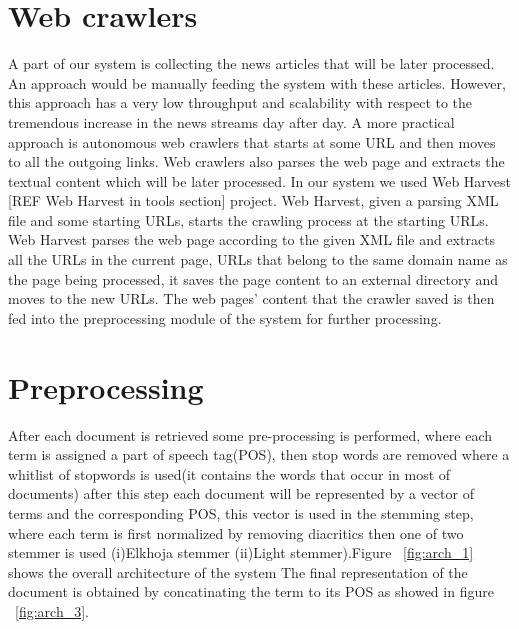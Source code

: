 \section{Web crawlers}\label{sec:crowlers}
A part of our system is collecting the news articles that will be later processed. An approach would be manually feeding the system with these articles. However, this approach has a very low throughput and scalability with respect to the tremendous increase in the news streams day after day. A more practical approach is autonomous web crawlers that starts at some URL and then moves to all the outgoing links. Web crawlers also parses the web page and extracts the textual content which will be later processed. In our system we used Web Harvest [REF Web Harvest in tools section] project. Web Harvest, given a parsing XML file and some starting URLs, starts the crawling process at the starting URLs. Web Harvest parses the web page according to the given XML file and extracts all the URLs in the current page, URLs that belong to the same domain name as the page being processed, it saves the page content to an external directory and moves to the new URLs. The web pages’ content that the crawler saved is then fed into the preprocessing module of the system for further processing.
\section{Preprocessing}\label{sec:preprocessing}
After each document is retrieved some pre-processing is performed, where each term is assigned a part of speech tag(POS), then stop words are removed where a whitlist of stopwords is used(it contains the words that occur in most of documents) after this step each document will be represented by a vector of terms and the corresponding POS, this vector is used in the stemming step, where each term is first normalized by removing diacritics then one of two stemmer is used (i)Elkhoja stemmer (ii)Light stemmer).Figure ~\ref{fig:arch_1} shows the overall architecture of the system
The final representation of the document is obtained by concatinating the term to its POS as showed in figure ~\ref{fig:arch_3}.

